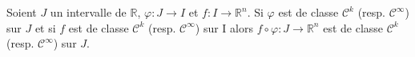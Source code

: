 \documentclass[a4paper,10pt]{report}
\begin{document}
%


\begin{prop}[composition] Soient $J$ un intervalle de $\mathbb{R}$, $\varphi : J \rightarrow I$ et $f : I \rightarrow \mathbb{R}^n$. Si $\varphi$ est de classe $\mathcal{C}^k$ (resp. $\mathcal{C}^{\infty}$) sur $J$ et si $f$ est de classe $\mathcal{C}^k$ (resp. $\mathcal{C}^{\infty}$) sur I alors $f \circ \varphi : J \rightarrow \mathbb{R}^n$ est de classe $\mathcal{C}^k$ (resp. $\mathcal{C}^{\infty}$) sur $J$. 
\end{prop}
\end{document}
